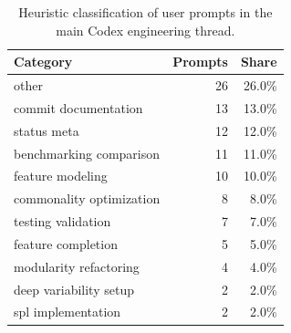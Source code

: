 \begin{table}[t]
\centering
\caption{Heuristic classification of user prompts in the main Codex engineering thread.}
\label{tab:codex-prompts}
\small
\begin{tabular}{@{}lrr@{}}
\toprule
\textbf{Category} & \textbf{Prompts} & \textbf{Share} \\
\midrule
other & 26 & 26.0\% \\
commit documentation & 13 & 13.0\% \\
status meta & 12 & 12.0\% \\
benchmarking comparison & 11 & 11.0\% \\
feature modeling & 10 & 10.0\% \\
commonality optimization & 8 & 8.0\% \\
testing validation & 7 & 7.0\% \\
feature completion & 5 & 5.0\% \\
modularity refactoring & 4 & 4.0\% \\
deep variability setup & 2 & 2.0\% \\
spl implementation & 2 & 2.0\% \\
\bottomrule
\end{tabular}
\end{table}
